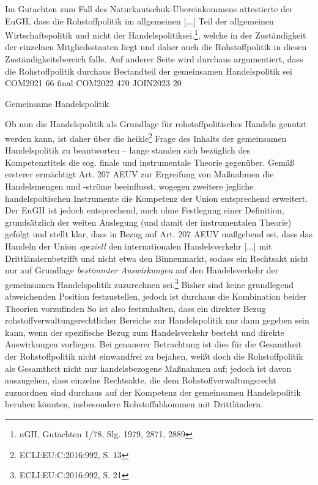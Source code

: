 \documentclass[12pt,a4paper,oneside]{book} %
\begin{document}
	Im Gutachten zum Fall des Naturkautschuk-Übereinkommens attestierte der EuGH, dass die \glqq Rohstoffpolitik im allgemeinen [...] Teil der allgemeinen Wirtschaftspolitik und nicht der Handelspolitik\grqq sei.\footnote{ uGH, Gutachten 1/78, Slg. 1979, 2871, 2889}, welche in der Zuständigkeit der einzelnen Mitgliedsstaaten liegt und daher auch die Rohstoffpolitik in diesen Zuständigkeitsbereich falle. Auf anderer Seite wird durchaus argumentiert, dass die Rohstoffpolitik durchaus Bestandteil der gemeinsamen Handelspolitik sei\autocite{Benedek, Art. 179 EGV, Rn. 6, 2009, 40. Aufl.}
	COM2021 66 final
	COM2022 470
	JOIN2023 20
	
	
	Gemeinsame Handelspolitik
	
	Ob nun die Handelspolitik als Grundlage für rohstoffpolitisches Handeln genutzt werden kann, ist daher über die \glqq heikle\grqq \footnote{ECLI:EU:C:2016:992, S. 13} Frage des Inhalts der gemeinsamen Handelspolitik zu beantworten -- lange standen sich bezüglich des Kompetenztitels die sog. finale und instrumentale Theorie gegenüber. Gemäß ersterer ermächtigt Art. 207 AEUV zur Ergreifung von Maßnahmen die Handelsmengen und -ströme beeinflusst, wogegen zweitere jegliche handelspoltischen Instrumente die Kompetenz der Union entsprechend erweitert.\autocite{Callies/Ruffert, Art. 207, Rn. 11} Der EuGH ist jedoch entsprechend, auch ohne Festlegung einer Definition, grundsätzlich der weiten Auslegung (und damit der instrumentalen Theorie) gefolgt und stellt klar, dass in Bezug auf Art. 207 AEUV maßgebend sei, dass das \glqq Handeln der Union \textit{speziell} den internationalen Handelsverkehr [...] mit Drittländern\grqq betrifft und nicht etwa den Binnenmarkt, sodass ein Rechtsakt nicht nur auf Grundlage \textit{bestimmter Auswirkungen} auf den Handelsverkehr der gemeinsamen Handelspolitik zuzurechnen sei.\footnote{ECLI:EU:C:2016:992, S. 21}
	Bisher sind  keine grundlegend abweichenden Position festzustellen, jedoch ist durchaus die Kombination beider Theorien vorzufinden\autocites{Callies/Ruffert, Art. 207, Rn. 11}{Müller-Ibold, in: Lenz/Borchardt (Hrsg.), EU-Verträge, Vorb. zu Art. 206, Rn. 4;}{Weiß, in: Grabitz/Hilf/Nettesheim, EU, Art. 207, Rn. 69.}
	So ist also festzuhalten, dass ein direkter Bezug rohstoffverwaltungsrechtlicher Bereiche zur Handelspolitik nur dann gegeben sein kann, wenn der spezifische Bezug zum Handelsverkehr besteht und direkte Auswirkungen vorliegen. Bei genauerer Betrachtung ist dies für die Gesamtheit der Rohstoffpolitik nicht einwandfrei zu bejahen, weißt doch die Rohstoffpolitik als Gesamtheit nicht nur handelsbezogene Maßnahmen auf; jedoch ist davon auszugehen, dass einzelne Rechtsakte, die dem Rohstoffverwaltungsrecht zuzuordnen sind durchaus auf der Kompetenz der gemeinsamen Handelspolitik beruhen könnten, insbesondere Rohstoffabkommen mit Drittländern.
	
\end{document}

